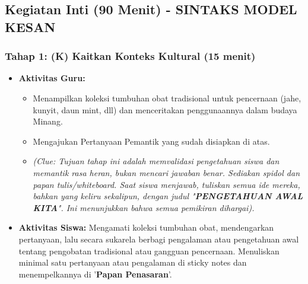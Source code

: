 \documentclass[a4paper,12pt]{article}
\begin{document}
\subsection{Kegiatan Inti (90 Menit) - SINTAKS MODEL KESAN}

\subsubsection{Tahap 1: (K) Kaitkan Konteks Kultural (15 menit)}
\begin{itemize}
\item \textbf{Aktivitas Guru:}
    \begin{itemize}
    \item Menampilkan koleksi tumbuhan obat tradisional untuk pencernaan (jahe, kunyit, daun mint, dll) dan menceritakan penggunaannya dalam budaya Minang.
    \item Mengajukan Pertanyaan Pemantik yang sudah disiapkan di atas.
    \item \textit{(Clue: Tujuan tahap ini adalah memvalidasi pengetahuan siswa dan memantik rasa heran, bukan mencari jawaban benar. Sediakan spidol dan papan tulis/whiteboard. Saat siswa menjawab, tuliskan semua ide mereka, bahkan yang keliru sekalipun, dengan judul "\textbf{PENGETAHUAN AWAL KITA}". Ini menunjukkan bahwa semua pemikiran dihargai).}
    \end{itemize}
\item \textbf{Aktivitas Siswa:} Mengamati koleksi tumbuhan obat, mendengarkan pertanyaan, lalu secara sukarela berbagi pengalaman atau pengetahuan awal tentang pengobatan tradisional atau gangguan pencernaan. Menuliskan minimal satu pertanyaan atau pengalaman di sticky notes dan menempelkannya di '\textbf{Papan Penasaran}'.
\end{itemize}
\end{document}
